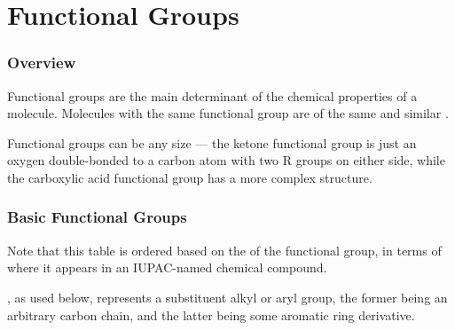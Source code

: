 

\pagebreak
\hypertarget{ChapterFunctionalGroups}{}
\part{Functional Groups}

	\section{Overview}

		Functional groups are the main determinant of the chemical properties of a molecule. Molecules with the
		same functional group are of the same  and similar .

		Functional groups can be any size --- the ketone functional group is just an oxygen double-bonded to a carbon atom
		with two R groups on either side, while the carboxylic acid functional group has a more complex structure.


	\section{Basic Functional Groups}

		Note that this table is ordered based on the  of the functional group, in terms of where it appears in
		an IUPAC-named chemical compound.

		, as used below, represents a substituent alkyl or aryl group, the former being an arbitrary carbon chain, and the
		latter being some aromatic ring derivative.

